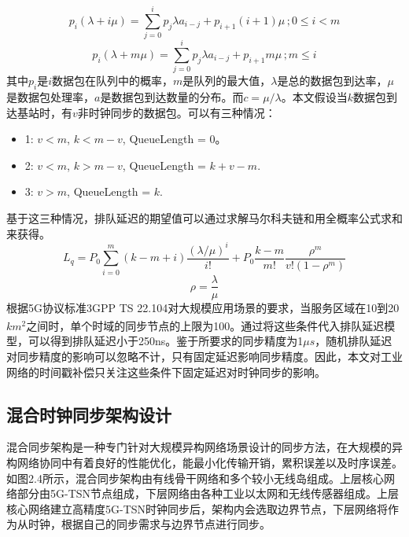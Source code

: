 \documentclass[UTF8,a4paper,12pt]{ctexart}
\numberwithin{equation}{section}
\begin{document}
\begin{equation*}
	p_i\left( \lambda +i \mu \right) =\sum_{j=0}^i{p_j \lambda  a_{i-j}+p_{i+1}\left( i+1 \right)  \mu\, ; 0\leqslant i<m}
\end{equation*}
\begin{equation}
	p_i\left( \lambda +m \mu \right) =\sum_{j=0}^i{p_j \lambda  a_{i-j}+p_{i+1}m \mu}\,; m\leqslant i
\end{equation}
其中$p_i$是$i$数据包在队列中的概率，$m$是队列的最大值，$\lambda$是总的数据包到达率，$\mu$是数据包处理率，$a$是数据包到达数量的分布。而$c=\mu/\lambda $。本文假设当$k$数据包到达基站时，有$v$非时钟同步的数据包。可以有三种情况：
\begin{itemize}
	\item 1: $v<m$, $k<m-v$, QueueLength = 0。
	\item 2: $v<m$, $k>m-v$, QueueLength = $k+v-m$.
	\item 3: $v>m$, QueueLength = $k$.
\end{itemize}

基于这三种情况，排队延迟的期望值可以通过求解马尔科夫链和用全概率公式求和来获得。
\begin{equation*}
	L_q=P_0 \sum_{i=0}^m{\left(k-m+i\right) \frac{\left(\lambda/\mu\right)^i}{i!}+P_0 \frac{k-m}{m!} \frac{\rho^m}{v!\left(1-\rho^m\right)}}
\end{equation*}
\begin{equation}
	\rho=\frac{\lambda}{\mu}
\end{equation}
根据5G协议标准3GPP TS 22.104对大规模应用场景的要求，当服务区域在10到20$km^2$之间时，单个时域的同步节点的上限为100\textsuperscript{\cite{888889}}。通过将这些条件代入排队延迟模型，可以得到排队延迟小于250ns。鉴于所要求的同步精度为1$\mu s$，随机排队延迟对同步精度的影响可以忽略不计，只有固定延迟影响同步精度。因此，本文对工业网络的时间戳补偿只关注这些条件下固定延迟对时钟同步的影响。

\subsection{混合时钟同步架构设计}

混合同步架构是一种专门针对大规模异构网络场景设计的同步方法，在大规模的异构网络协同中有着良好的性能优化，能最小化传输开销，累积误差以及时序误差。如图2.4所示，混合同步架构由有线骨干网络和多个较小无线岛组成。上层核心网络部分由5G-TSN节点组成，下层网络由各种工业以太网和无线传感器组成。上层核心网络建立高精度5G-TSN时钟同步后，架构内会选取边界节点，下层网络将作为从时钟，根据自己的同步需求与边界节点进行同步。
\end{document}
